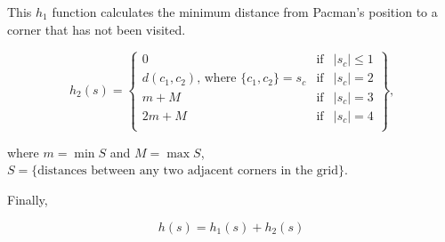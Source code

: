 \documentclass{article}
\begin{document}
This $h_1$ function calculates the minimum distance from Pacman's position to a corner that has not been visited.

\begin{equation}
    h_2(s) = \left\{ \begin{array}{lcc}
        0 &   \text{if}  & |s_c| \leq 1 \\
        d(c_1,c_2)\text{, where } \{c_1,c_2\}=s_c &   \text{if}  & |s_c| = 2 \\
        m+M &   \text{if}  & |s_c| = 3 \\
        2m+M &   \text{if}  & |s_c| = 4 \\
        \end{array}
        \right\}\text{,}
\end{equation}

where $m = \min S$ and $M = \max S$, $S=\{\text{distances between any two adjacent corners in the grid}\}$. 

Finally, 

\begin{equation}
    h(s) = h_1(s)+h_2(s)
\end{equation}
\end{document}
